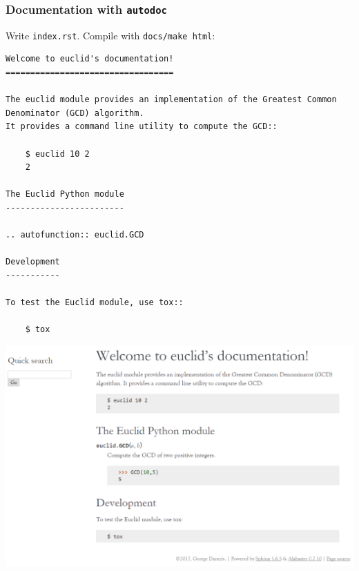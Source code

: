\documentclass{beamer} %
\begin{document}
\begin{frame}[fragile]

\frametitle{Documentation with \texttt{autodoc}}

Write \texttt{index.rst}. Compile with \texttt{docs/make html}:
\begin{tiny}
\begin{verbatim}
Welcome to euclid's documentation!
==================================

The euclid module provides an implementation of the Greatest Common Denominator (GCD) algorithm. 
It provides a command line utility to compute the GCD::

    $ euclid 10 2
    2

The Euclid Python module
------------------------

.. autofunction:: euclid.GCD

Development
-----------

To test the Euclid module, use tox::

    $ tox

\end{verbatim}
\end{tiny}

\end{frame}

\begin{frame}

\begin{center}
\includegraphics[scale=0.5]{assets/docs}
\end{center}

\end{frame}
\end{document}
